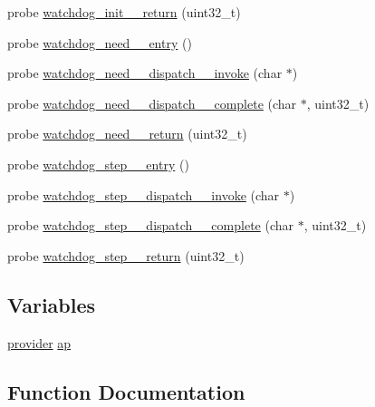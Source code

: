 \begin{DoxyCompactItemize}
\item 
probe \hyperlink{apache__probes_8d_ac83e0b4f248c0a2ceec771d94658d85d}{watchdog\+\_\+init\+\_\+\+\_\+return} (uint32\+\_\+t)
\item 
probe \hyperlink{apache__probes_8d_af25a4f09bc6b492bbeab01f65935baf8}{watchdog\+\_\+need\+\_\+\+\_\+entry} ()
\item 
probe \hyperlink{apache__probes_8d_aa2eaa8f8b7395134e90e351ce01c7aff}{watchdog\+\_\+need\+\_\+\+\_\+dispatch\+\_\+\+\_\+invoke} (char $\ast$)
\item 
probe \hyperlink{apache__probes_8d_ab188a50b15c6c2d0e7ccc1a33e77fc61}{watchdog\+\_\+need\+\_\+\+\_\+dispatch\+\_\+\+\_\+complete} (char $\ast$, uint32\+\_\+t)
\item 
probe \hyperlink{apache__probes_8d_af6cb35cc4cf5b762dbb1048c1a2a80d2}{watchdog\+\_\+need\+\_\+\+\_\+return} (uint32\+\_\+t)
\item 
probe \hyperlink{apache__probes_8d_af87d412729b8db543d1bd57def67dba2}{watchdog\+\_\+step\+\_\+\+\_\+entry} ()
\item 
probe \hyperlink{apache__probes_8d_aa054215d097ca35868558d64e9d7e82e}{watchdog\+\_\+step\+\_\+\+\_\+dispatch\+\_\+\+\_\+invoke} (char $\ast$)
\item 
probe \hyperlink{apache__probes_8d_a931115cebb5108a34e4fe51a280f68be}{watchdog\+\_\+step\+\_\+\+\_\+dispatch\+\_\+\+\_\+complete} (char $\ast$, uint32\+\_\+t)
\item 
probe \hyperlink{apache__probes_8d_a97551ee55b6b75c04f72c0f8f7566224}{watchdog\+\_\+step\+\_\+\+\_\+return} (uint32\+\_\+t)
\end{DoxyCompactItemize}
\subsection*{Variables}
\begin{DoxyCompactItemize}
\item 
\hyperlink{group__MOD__DAV_gaf0b2e32aa25087ef77626ce8bb9d7aa4}{provider} \hyperlink{group__APR__Strings__Snprintf_ga21ecbc810cd93b85a818c96ca2f92f1a}{ap}
\end{DoxyCompactItemize}


\subsection{Function Documentation}
